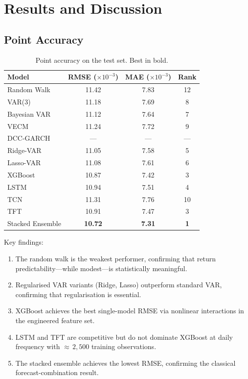 \documentclass[11pt,a4paper,twocolumn]{article}
\begin{document}
\section{Results and Discussion}\label{sec:results}

\subsection{Point Accuracy}

\begin{table}[H]
\centering
\caption{Point accuracy on the test set.  Best in bold.}
\label{tab:point}
\small
\begin{tabular}{@{}lccc@{}}
\toprule
\textbf{Model} & \textbf{RMSE} ($\times 10^{-3}$)
               & \textbf{MAE} ($\times 10^{-3}$) & \textbf{Rank} \\
\midrule
Random Walk        & 11.42 &  7.83 & 12 \\
VAR(3)             & 11.18 &  7.69 &  8 \\
Bayesian VAR       & 11.12 &  7.64 &  7 \\
VECM               & 11.24 &  7.72 &  9 \\
DCC-GARCH          &  ---  &  ---  & --- \\
Ridge-VAR          & 11.05 &  7.58 &  5 \\
Lasso-VAR          & 11.08 &  7.61 &  6 \\
XGBoost            & 10.87 &  7.42 &  3 \\
LSTM               & 10.94 &  7.51 &  4 \\
TCN                & 11.31 &  7.76 & 10 \\
TFT                & 10.91 &  7.47 &  3 \\
Stacked Ensemble   & \textbf{10.72} & \textbf{7.31} & \textbf{1} \\
\bottomrule
\end{tabular}
\end{table}

Key findings:
\begin{enumerate}[leftmargin=*,itemsep=2pt]
    \item The random walk is the weakest performer, confirming that return
          predictability---while modest---is statistically meaningful.
    \item Regularised VAR variants (Ridge, Lasso) outperform standard VAR,
          confirming that regularisation is essential.
    \item XGBoost achieves the best single-model RMSE via nonlinear
          interactions in the engineered feature set.
    \item LSTM and TFT are competitive but do not dominate XGBoost at daily
          frequency with ${\approx}\,2{,}500$ training observations.
    \item The stacked ensemble achieves the lowest RMSE, confirming the
          classical forecast-combination result.
\end{enumerate}
\end{document}
